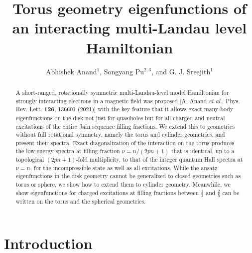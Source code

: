 \documentclass[prb,aps,epsfig,longbibliography,twocolumn]{revtex4-1}
\begin{document}
\title{Torus geometry eigenfunctions of an interacting multi-Landau level Hamiltonian}
\author{Abhishek Anand$^{1}$, Songyang Pu$^{2,3}$, and G. J. Sreejith$^{1}$}

\begin{abstract}
A short-ranged, rotationally symmetric multi-Landau-level model Hamiltonian for strongly interacting electrons in a magnetic field was proposed [A. Anand \textit{et al.}, Phys. Rev. Lett. \textbf{126}, 136601 (2021)] with the key feature that it allows exact many-body eigenfunctions on the disk not just for quasiholes but for all charged and neutral excitations of the entire Jain sequence filling fractions.
%
We extend this to geometries without full rotational symmetry, namely the torus and cylinder geometries, and present their spectra.
%
Exact diagonalization of the interaction on the torus produces the low-energy spectra at filling fraction $\nu=n/(2pn+1)$ that is identical, up to a topological $(2pn+1)$-fold multiplicity, to that of the integer quantum Hall spectra at $\nu=n$, for the incompressible state as well as all excitations.
While the ansatz eigenfunctions in the disk geometry cannot be generalized to closed geometries such as torus or sphere, we show how to extend them to cylinder geometry. Meanwhile, we show eigenfunctions for charged excitations at filling fractions between $\frac{1}{3}$ and $\frac{2}{5}$ can be written on the torus and the spherical geometries.
\end{abstract}
\maketitle

\section{Introduction} \label{intro}
\end{document}
